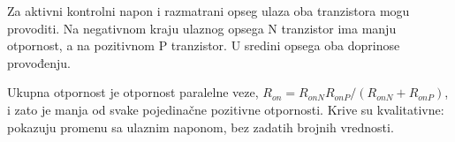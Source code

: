 Za aktivni kontrolni napon i razmatrani opseg ulaza oba tranzistora mogu provoditi. Na negativnom kraju ulaznog opsega N tranzistor ima manju otpornost, a na pozitivnom P tranzistor. U sredini opsega oba doprinose provođenju.

Ukupna otpornost je otpornost paralelne veze, $R_{on}=R_{onN}R_{onP}/(R_{onN}+R_{onP})$, i zato je manja od svake pojedinačne pozitivne otpornosti. Krive su kvalitativne: pokazuju promenu sa ulaznim naponom, bez zadatih brojnih vrednosti.
